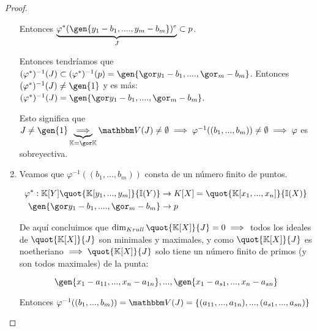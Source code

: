 \begin{proof}
\begin{enumerate}
		Entonces $\underbrace{\varphi^*(\gen{y_1-b_1,....,y_m-b_m})^e}_{J} \subset p$. 
		
		Entonces tendríamos que $(\varphi^*)^{-1}(J) \subset (\varphi^*)^{-1}(p)=\gen{\cls{y_1-b_1},....,\cls{_m-b_m}}$. Entonces $(\varphi^*)^{-1}(J) \neq \gen{1}$ y es más: $(\varphi^*)^{-1}(J) = \gen{\cls{y_1-b_1},....,\cls{_m-b_m}}$.
		
		Esto significa que $J \neq \gen{1} \underbrace{\implies}_{\K = \cls{\K}} \V(J) \neq \emptyset \implies \varphi^{-1}((b_1,...,b_m)) \neq \emptyset \implies \varphi$ es sobreyectiva.
		
		\item Veamos que $\varphi^{-1}((b_1,...,b_m))$ consta de un número finito de puntos.
		
		\begin{align*}
			\varphi^*: \K[Y]  \quot{\K[y_1,...,y_m]}{\I(Y)}& \rightarrow K[X] = \quot{\K[x_1,...,x_n]}{\I(X)} \\
			\gen{\cls{y_1-b_1},....,\cls{_m-b_m}} & \rightarrow p
		\end{align*}
		
		
		De aquí concluimos que $\dk \quot{\K[X]}{J}=0 \implies$ todos los ideales de $\quot{\K[X]}{J}$ son minimales y maximales, y como $\quot{\K[X]}{J}$ es noetheriano $\implies \quot{\K[X]}{J}$ solo tiene un número finito de primos (y son todos maximales) de la punta:
		
		$$ \gen{x_1-a_{11},...,x_n-a_{1n}},...,\gen{x_1-a_{s1},...,x_n-a_{sn}} $$
		
		Entonces $\varphi^{-1}((b_1,...,b_m))= \V(J)=\{ (a_{11},...,a_{1n}),...,(a_{s1},...,a_{sn}) \}$
	\end{enumerate}
\end{proof}

